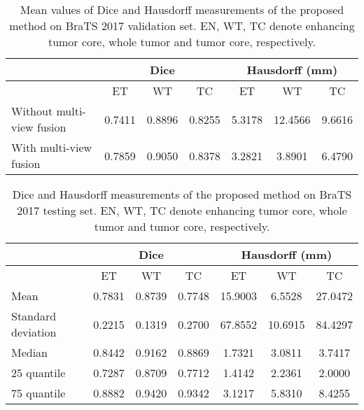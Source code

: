 \documentclass[a4paper,orivec,runningheads]{llncs}
\begin{document}
\begin{table}
	\centering
	\small
	\caption{Mean values of Dice and Hausdorff measurements of the proposed method on BraTS 2017 validation set. EN, WT, TC denote enhancing tumor core, whole tumor and tumor core, respectively.}
	\label{tab:valid}
	\begin{tabular}{l|c|c|c|c|c|c}
		\hline
		& \multicolumn{3}{c|}{Dice} & \multicolumn{3}{c}{Hausdorff (mm)}  \\ \hline
		& ET & WT & TC & ET & WT & TC \\ \hline
		Without multi-view fusion & 0.7411 & 0.8896 & 0.8255 & 5.3178 & 12.4566 & 9.6616 \\
		With multi-view fusion & 0.7859 & 0.9050 & 0.8378 & 3.2821 & 3.8901 & 6.4790 \\
		\hline
	\end{tabular}
\end{table}
\begin{table}
	\centering
	\small
	\caption{Dice and Hausdorff measurements of the proposed method on BraTS 2017 testing set. EN, WT, TC denote enhancing tumor core, whole tumor and tumor core, respectively.}
	\label{tab:test}
	\begin{tabular}{l|c|c|c|c|c|c}
		\hline
		& \multicolumn{3}{c|}{Dice} & \multicolumn{3}{c}{Hausdorff (mm)}  \\ \hline
		& ET & WT & TC & ET & WT & TC \\ \hline
		Mean & 0.7831 & 0.8739 & 0.7748 & 15.9003 & 6.5528 & 27.0472 \\
		Standard deviation & 0.2215 & 0.1319 & 0.2700 & 67.8552 & 10.6915 & 84.4297 \\
		Median & 0.8442 & 0.9162 & 0.8869 & 1.7321 & 3.0811 & 3.7417\\
25 quantile & 0.7287 & 0.8709 & 0.7712 & 1.4142 & 2.2361 & 2.0000 \\	
75 quantile & 0.8882 & 0.9420 & 0.9342 & 3.1217 & 5.8310 & 8.4255 \\		\hline
	\end{tabular}
\end{table}
\end{document}
